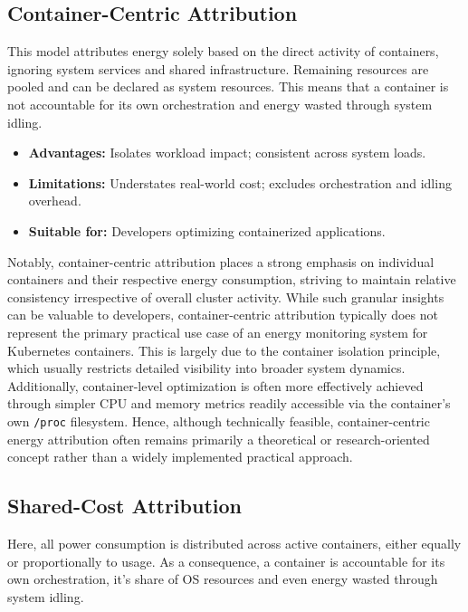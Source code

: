 \subsection{Container-Centric Attribution}
\label{sec:container-centric}

This model attributes energy solely based on the direct activity of containers, ignoring system services and shared infrastructure. Remaining resources are pooled and can be declared as system resources. This means that a container is not accountable for its own orchestration and energy wasted through system idling.

\begin{itemize}
    \item \textbf{Advantages:} Isolates workload impact; consistent across system loads.
    \item \textbf{Limitations:} Understates real-world cost; excludes orchestration and idling overhead.
    \item \textbf{Suitable for:} Developers optimizing containerized applications.
\end{itemize}

Notably, container-centric attribution places a strong emphasis on individual containers and their respective energy consumption, striving to maintain relative consistency irrespective of overall cluster activity. While such granular insights can be valuable to developers, container-centric attribution typically does not represent the primary practical use case of an energy monitoring system for Kubernetes containers. This is largely due to the container isolation principle, which usually restricts detailed visibility into broader system dynamics. Additionally, container-level optimization is often more effectively achieved through simpler CPU and memory metrics readily accessible via the container’s own \texttt{/proc} filesystem. Hence, although technically feasible, container-centric energy attribution often remains primarily a theoretical or research-oriented concept rather than a widely implemented practical approach.

\subsection{Shared-Cost Attribution}
\label{sec:shared-cost}

Here, all power consumption is distributed across active containers, either equally or proportionally to usage. As a consequence, a container is accountable for its own orchestration, it's share of OS resources and even energy wasted through system idling.

